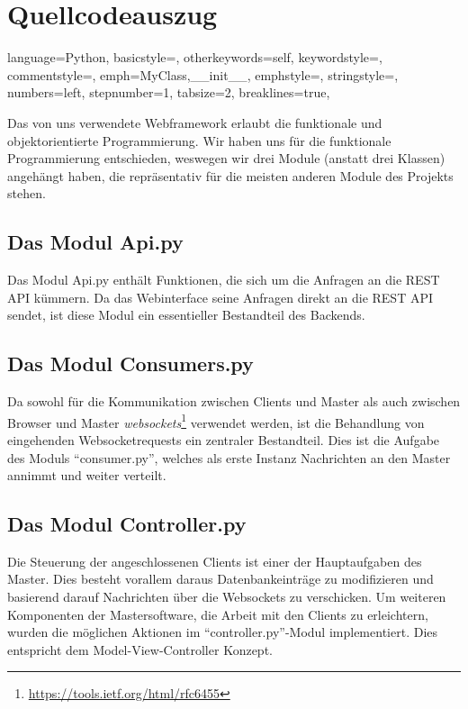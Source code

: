 \section{Quellcodeauszug}


\lstset
{
    language=Python,
    basicstyle=\footnotesize,
    otherkeywords={self},             %
    keywordstyle=\color{deepblue},
    commentstyle=\color{string-color},
    emph={MyClass,__init__},          %
    emphstyle=\color{deepred},    %
    stringstyle=\color{deepgreen},
    numbers=left,
    stepnumber=1,
    tabsize=2,
    breaklines=true,
}

Das von uns verwendete Webframework erlaubt die funktionale und objektorientierte Programmierung. Wir haben uns für die funktionale Programmierung
entschieden, weswegen wir drei Module (anstatt drei Klassen) angehängt haben, die repräsentativ für die meisten
anderen Module des Projekts stehen.

\subsection{Das Modul Api.py}
Das Modul Api.py enthält Funktionen, die sich um die Anfragen an die REST API kümmern.
Da das Webinterface seine Anfragen direkt an die REST API sendet, ist diese Modul ein essentieller
Bestandteil des Backends.


\subsection{Das Modul Consumers.py}
Da sowohl für die Kommunikation zwischen Clients und Master als auch zwischen Browser und
Master \textit{websockets}\footnote{\url{https://tools.ietf.org/html/rfc6455}} verwendet werden,
ist die Behandlung von eingehenden Websocketrequests ein zentraler Bestandteil. Dies ist die
Aufgabe des Moduls "`consumer.py"', welches als erste Instanz Nachrichten an den Master annimmt und
weiter verteilt.



\subsection{Das Modul Controller.py}
Die Steuerung der angeschlossenen Clients ist einer der Hauptaufgaben des
Master. Dies besteht vorallem daraus Datenbankeinträge zu modifizieren und
basierend darauf Nachrichten über die Websockets zu verschicken. Um weiteren
Komponenten der Mastersoftware, die Arbeit mit den Clients zu erleichtern,
wurden die möglichen Aktionen im "`controller.py"'-Modul implementiert. Dies
entspricht dem Model-View-Controller Konzept.


